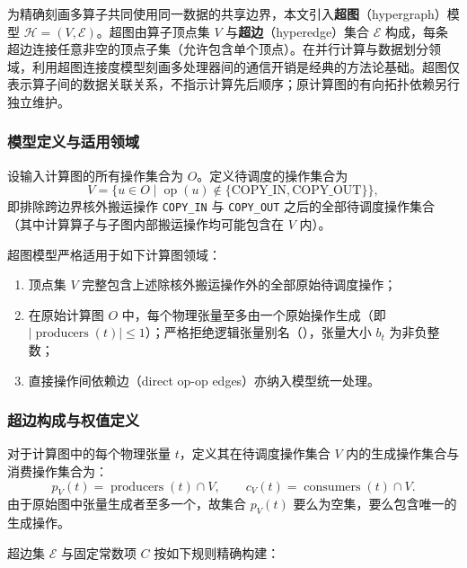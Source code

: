 \documentclass[anonymous,withtoc]{gmcm2026}
\providecommand{\tightlist}{\setlength{\itemsep}{0pt}\setlength{\parskip}{0pt}}
\begin{document}
为精确刻画多算子共同使用同一数据的共享边界，本文引入\textbf{超图}（hypergraph）模型 \(\mathcal{H} = (V, \mathcal{E})\)。超图由算子顶点集 \(V\) 与\textbf{超边}（hyperedge）集合 \(\mathcal{E}\) 构成，每条超边连接任意非空的顶点子集（允许包含单个顶点）\cite{ref5}。在并行计算与数据划分领域，利用超图连接度模型刻画多处理器间的通信开销是经典的方法论基础\cite{ref3}。超图仅表示算子间的数据关联关系，不指示计算先后顺序；原计算图的有向拓扑依赖另行独立维护。

\subsubsection{模型定义与适用领域}

设输入计算图的所有操作集合为 \(O\)。定义待调度的操作集合为 \begin{equation}
V = \{u \in O \mid \operatorname{op}(u) \notin \{\text{COPY\_IN}, \text{COPY\_OUT}\}\},
\end{equation} 即排除跨边界核外搬运操作 \texttt{COPY\_IN} 与 \texttt{COPY\_OUT} 之后的全部待调度操作集合（其中计算算子与子图内部搬运操作均可能包含在 \(V\) 内）。

超图模型严格适用于如下计算图领域：

\begin{enumerate}
\def\labelenumi{\arabic{enumi}.}
\tightlist
\item
  顶点集 \(V\) 完整包含上述除核外搬运操作外的全部原始待调度操作；
\item
  在原始计算图 \(O\) 中，每个物理张量至多由一个原始操作生成（即 \(|\operatorname{producers}(t)| \le 1\)）；严格拒绝逻辑张量别名（\texttt{}），张量大小 \(b_t\) 为非负整数；
\item
  直接操作间依赖边（direct op-op edges）亦纳入模型统一处理。
\end{enumerate}

\subsubsection{超边构成与权值定义}

对于计算图中的每个物理张量 \(t\)，定义其在待调度操作集合 \(V\) 内的生成操作集合与消费操作集合为： \begin{equation}
p_V(t) = \operatorname{producers}(t) \cap V, \qquad c_V(t) = \operatorname{consumers}(t) \cap V.
\end{equation} 由于原始图中张量生成者至多一个，故集合 \(p_V(t)\) 要么为空集，要么包含唯一的生成操作。

超边集 \(\mathcal{E}\) 与固定常数项 \(C\) 按如下规则精确构建：
\end{document}
